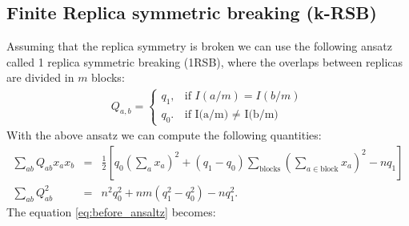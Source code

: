 \documentclass{article}
\begin{document}
\subsection{Finite Replica symmetric breaking (k-RSB)}
Assuming that the replica symmetry is broken we can use the following ansatz called 1 replica symmetric breaking (1RSB), where the overlaps between replicas are divided in $m$ blocks:
\begin{eqnarray}
    Q_{a,b}=\begin{cases}
			q_1, & \text{if $I(a/m)=I(b/m)$}\\
            q_0. & \text{if I(a/m) $\neq$ I(b/m)}
		 \end{cases}
\end{eqnarray}
With the above ansatz we can compute the following quantities:
\begin{eqnarray}
\sum_{ab} Q_{ab} x_{a} x_{b} &=& \frac{1}{2} \left[ q_0 \left( \sum_{a}x_a\right)^2 + (q_1-q_0) \sum_{\text{blocks}} \left( \sum_{a \in \text{block}}x_a\right)^2  -nq_1\right] \\
\sum_{ab} Q_{ab}^2 &=&  n^2 q_0^2 + nm(q_1^2 - q_0^2) -n q_1^2.
\end{eqnarray}
The equation \ref{eq:before_ansaltz} becomes:
\end{document}
